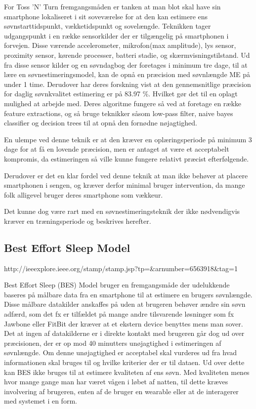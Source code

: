 For Toss 'N' Turn fremgangsmåden er tanken at man blot skal have sin smartphone lokaliseret i sit soveværelse for at den kan estimere ens søvnstarttidspunkt, vækketidspunkt og sovelængde.
Teknikken tager udgangspunkt i en række sensorkilder der er tilgængelig på smartphonen i forvejen.
Disse værende accelerometer, mikrofon(max amplitude), lys sensor, proximity sensor, kørende processer, batteri stadie, og skærmvisningstilstand.
Ud fra disse sensor kilder og en søvndagbog der foretages i minimum tre dage, til at lære en søvnestimeringsmodel, kan de opnå en præcision med søvnlængde ME på under 1 time.
Derudover har deres forskning vist at den gennemsnitlige præcision for daglig søvnkvalitet estimering er på 83.97 \%. Hvilket gør det til en oplagt mulighed at arbejde med.
Deres algoritme fungere så ved at foretage en række feature extractions, og så bruge teknikker såsom low-pass filter, naive bayes classifier og decision trees til at opnå den fornødne nøjagtighed.

En ulempe ved denne teknik er at den kræver en oplæringsperiode på minimum 3 dage for at få en lovende præcision, men er antaget at være et acceptabelt kompromis, da estimeringen så ville kunne fungere relativt præcist efterfølgende.

Derudover er det en klar fordel ved denne teknik at man ikke behøver at placere smartphonen i sengen, og kræver derfor minimal bruger intervention, da mange folk alligevel bruger deres smartphone som vækkeur.

Det kunne dog være rart med en søvnestimeringsteknik der ikke nødvendigvis kræver en træningsperiode og beskrives herefter.

\subsection{Best Effort Sleep Model}
http://ieeexplore.ieee.org/stamp/stamp.jsp?tp=&arnumber=6563918&tag=1 

Best Effort Sleep (BES) Model bruger en fremgangsmåde der udelukkende baseres på målbare data fra en smartphone til at estimere en brugers søvnlængde.
Disse målbare datakilder anskaffes på uden at brugeren behøver ændre sin søvn adfærd, som det fx er tilfældet på mange andre tilsvarende løsninger som fx Jawbone eller FitBit der kræver at et ekstern device benyttes mens man sover.
Det at ingen af datakilderne er i direkte kontakt med brugeren går dog ud over præcisionen, der er op mod 40 minutters unøjagtighed i estimeringen af søvnlængde.
Om denne unøjagtighed er acceptabel skal vurderes ud fra hvad informationen skal bruges til og hvilke kriterier der er til dataen.
Ud over dette kan BES ikke bruges til at estimere kvaliteten af ens søvn.
Med kvaliteten menes hvor mange gange man har været vågen i løbet af natten, til dette kræves involvering af brugeren, enten af de bruger en wearable eller at de interagerer med systemet i en form.

